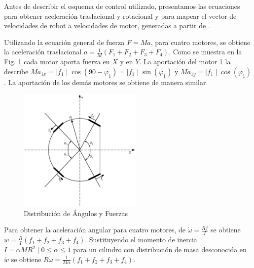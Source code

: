 \documentclass[twocolumn,10pt]{amrob}
\begin{document}
Antes de describir el esquema de control utilizado, presentamos las ecuaciones para obtener aceleración traslacional y rotacional y para mapear el vector de velocidades de robot a velocidades de motor,  generadas a partir de \cite{rojas2006holonomic}.

Utilizando la ecuación general de fuerza \( F = Ma \), para cuatro motores, se obtiene la aceleración traslacional $ a = \frac{1}{M}\left(F_1+F_2+F_3+F_4\right)$. Como se muestra en la Fig. \ref{fig:angFzaDiag} cada motor aporta fuerza en $X$ y en $Y$. La aportación del motor 1 la describe $Ma_{1x} = \mid f_1 \mid \cos\left(90 - \varphi_1\right) =  \mid f_1 \mid  \sin\left(\varphi_1\right)$ y $Ma_{1y} = \mid f_1 \mid \cos\left(\varphi_1\right)$. La aportación de los demás motores se obtiene de manera similar.

\begin{figure}
  \centering
    \includegraphics[height=6cm]{anglesRobot.eps}
  \caption{Distribución de Ángulos y Fuerzas}
  \label{fig:angFzaDiag}
\end{figure}

Para obtener la aceleración angular para cuatro motores, de \(\dot{\omega} = \frac{Rf}{I}\) se obtiene  $\dot{w} =\frac{R}{I}\left(f_1+f_2+f_3+f_4\right)$. Sustituyendo el momento de inercia $I = \alpha M R^{2} \mid 0\leq \alpha \leq1$ para un cilindro con distribución de masa desconocida en $\dot{w}$  se obtiene  $R\dot{\omega} = \frac{1}{M\alpha}\left(f_1+f_2+f_3+f_4\right)$.
\end{document}
